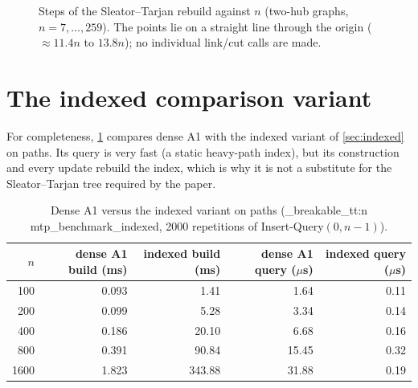 \documentclass[11pt,a4paper,oneside]{report}
\theoremstyle{plain}
\theoremstyle{definition}
\theoremstyle{remark}
\newcommand{\op}[1]{\textsf{#1}}
\DeclareRobustCommand{\code}[1]{\mtp_breakable_tt:n {#1}}
\begin{document}
\begin{figure}[ht]
\centering
{}
\caption[Linear dynamic-tree rebuild]{Steps of the Sleator--Tarjan rebuild against \(n\)
(two-hub graphs, \(n=7,\dots,259\)). The points lie on a straight line through the origin
(\(\approx 11.4n\) to \(13.8n\)); no individual link/cut calls are made.}
\label{fig:rebuild}
\end{figure}

\section{The indexed comparison variant}
For completeness, \cref{tab:indexed} compares dense A1 with the indexed variant of
\cref{sec:indexed} on paths. Its query is very fast (a static heavy-path index), but its
construction and every update rebuild the index, which is why it is not a substitute for the
Sleator--Tarjan tree required by the paper.

\begin{table}[ht]
\centering\small
\caption[A1 versus the indexed variant]{Dense A1 versus the indexed variant on paths
(\code{mtp_benchmark_indexed}, 2000 repetitions of \op{Insert-Query}\((0,n-1)\)).}\label{tab:indexed}
\begin{tabular}{@{}rrrrr@{}}
\toprule
\(n\) & dense A1 build (ms) & indexed build (ms) & dense A1 query (\(\mu\)s) & indexed query (\(\mu\)s)\\
\midrule
100 & 0.093 & 1.41 & 1.64 & 0.11\\
200 & 0.099 & 5.28 & 3.34 & 0.14\\
400 & 0.186 & 20.10 & 6.68 & 0.16\\
800 & 0.391 & 90.84 & 15.45 & 0.32\\
1600 & 1.823 & 343.88 & 31.88 & 0.19\\
\bottomrule
\end{tabular}
\end{table}
\end{document}
